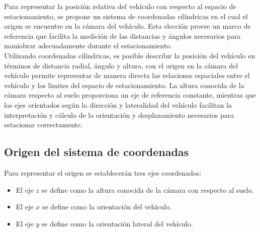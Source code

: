 \noindent
Para representar la posición relativa del vehículo con respecto al espacio de estacionamiento,
se propone un sistema de coordenadas cilíndricas en el cual el origen se encuentre en la cámara del vehículo.
Esta elección provee un marco de referencia que facilita la medición de las distancias
y ángulos necesarios para maniobrar adecuadamente durante el estacionamiento.\\
\noindent
Utilizando coordenadas cilíndricas, es posible describir la posición del vehículo en términos de distancia radial, ángulo y altura,
con el origen en la cámara del vehículo permite representar de manera directa
las relaciones espaciales entre el vehículo y los límites del espacio de estacionamiento.
La altura conocida de la cámara respecto al suelo proporciona un eje de referencia constante,
mientras que los ejes orientados según la dirección y lateralidad del vehículo facilitan la interpretación y cálculo de la orientación
y desplazamiento necesarios para estacionar correctamente.\\


\subsection{Origen del sistema de coordenadas}
Para representar el origen se establecerán tres ejes coordenados:
\begin{itemize}
    \item El eje $z$ se define como la altura conocida de la cámara con respecto al suelo.
    \item El eje $x$ se define como la orientación del vehículo.
    \item El eje $y$ se define como la orientación lateral del vehículo.
\end{itemize}

